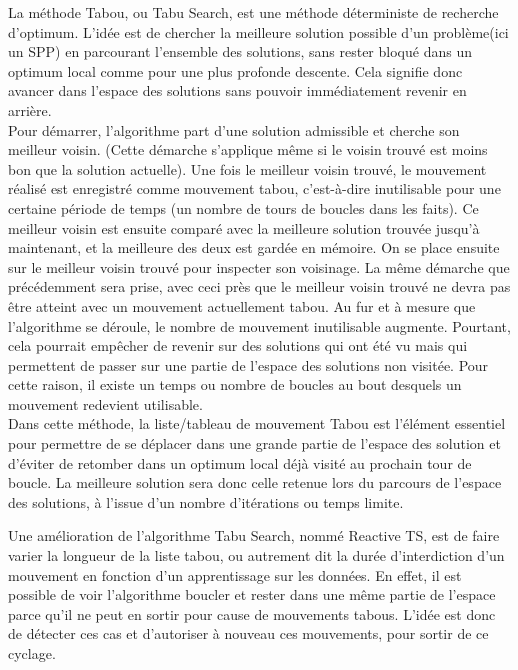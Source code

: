 La méthode Tabou, ou Tabu Search, est une méthode déterministe de recherche d'optimum. L'idée est de chercher la meilleure solution possible d'un problème(ici un SPP) en parcourant l'ensemble des solutions, sans rester bloqué dans un optimum local comme pour une plus profonde descente. Cela signifie donc avancer dans l'espace des solutions sans pouvoir immédiatement revenir en arrière. \\
Pour démarrer, l'algorithme part d'une solution admissible et cherche son meilleur voisin. (Cette démarche s'applique même si le voisin trouvé est moins bon que la solution actuelle). Une fois le meilleur voisin trouvé, le mouvement réalisé est enregistré comme mouvement tabou, c'est-à-dire inutilisable pour une certaine période de temps (un nombre de tours de boucles dans les faits). Ce meilleur voisin est ensuite comparé avec la meilleure solution trouvée jusqu'à maintenant, et la meilleure des deux est gardée en mémoire. On se place ensuite sur le meilleur voisin trouvé pour inspecter son voisinage. La même démarche que précédemment sera prise, avec ceci près que le meilleur voisin trouvé ne devra pas être atteint avec un mouvement actuellement tabou. Au fur et à mesure que l'algorithme se déroule, le nombre de mouvement inutilisable augmente. Pourtant, cela pourrait empêcher de revenir sur des solutions qui ont été vu mais qui permettent de passer sur une partie de l'espace des solutions non visitée. Pour cette raison, il existe un temps ou nombre de boucles au bout desquels un mouvement redevient utilisable.\\
Dans cette méthode, la liste/tableau de mouvement Tabou est l'élément essentiel pour permettre de se déplacer dans une grande partie de l'espace des solution et d'éviter de retomber dans un optimum local déjà visité au prochain tour de boucle. La meilleure solution sera donc celle retenue lors du parcours de l'espace des solutions, à l'issue d'un nombre d'itérations ou temps limite.

Une amélioration de l'algorithme Tabu Search, nommé Reactive TS, est de faire varier la longueur de la liste tabou, ou autrement dit la durée d'interdiction d'un mouvement en fonction d'un apprentissage sur les données.
En effet, il est possible de voir l'algorithme boucler et rester dans une même partie de l'espace parce qu'il ne peut en sortir pour cause de mouvements tabous. L'idée est donc de détecter ces cas et d'autoriser à nouveau ces mouvements, pour sortir de ce cyclage.



